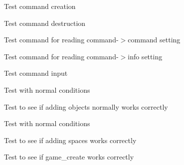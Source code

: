 
\begin{DoxyRefList}
\item[\label{test__test000001}%
\hypertarget{test__test000001}{}%
Member \hyperlink{command__test_8h_abed44af325fd42a3f4f4aa134315435c}{test1\+\_\+command\+\_\+create} ()]Test command creation  
\item[\label{test__test000002}%
\hypertarget{test__test000002}{}%
Member \hyperlink{command__test_8h_aadf731a98e5122e70ede7cdc68ba621f}{test1\+\_\+command\+\_\+destroy} ()]Test command destruction  
\item[\label{test__test000007}%
\hypertarget{test__test000007}{}%
Member \hyperlink{command__test_8h_aa5f2c4937af80de245778a8ac348cf3b}{test1\+\_\+command\+\_\+get\+\_\+command} ()]Test command for reading command-\/$>$command setting  
\item[\label{test__test000009}%
\hypertarget{test__test000009}{}%
Member \hyperlink{command__test_8h_a6aa58960e0653f7a4fb5c30350d64e54}{test1\+\_\+command\+\_\+get\+\_\+info} ()]Test command for reading command-\/$>$info setting  
\item[\label{test__test000004}%
\hypertarget{test__test000004}{}%
Member \hyperlink{command__test_8h_a932afa8fb63c9b8ba551d030886ce491}{test1\+\_\+command\+\_\+get\+\_\+user\+\_\+input} ()]Test command input  
\item[\label{test__test000085}%
\hypertarget{test__test000085}{}%
Member \hyperlink{game__test_8h_ab936ab03dff02b8edde97651f12384ea}{test1\+\_\+game\+\_\+add\+\_\+link} ()]Test with normal conditions  
\item[\label{test__test000047}%
\hypertarget{test__test000047}{}%
Member \hyperlink{game__test_8h_ac60415277fc72d0a231b17e482a6609b}{test1\+\_\+game\+\_\+add\+\_\+object} ()]Test to see if adding objects normally works correctly  
\item[\label{test__test000042}%
\hypertarget{test__test000042}{}%
Member \hyperlink{game__test_8h_a4adb115e4624c38738c938b999f6c949}{test1\+\_\+game\+\_\+add\+\_\+player} ()]Test with normal conditions  
\item[\label{test__test000038}%
\hypertarget{test__test000038}{}%
Member \hyperlink{game__test_8h_a49b59f8e75a8a4375c98ded865f16fcc}{test1\+\_\+game\+\_\+add\+\_\+space} ()]Test to see if adding spaces works correctly  
\item[\label{test__test000027}%
\hypertarget{test__test000027}{}%
Member \hyperlink{game__test_8h_a1d5c70cf073b025bb5d74413cecd929b}{test1\+\_\+game\+\_\+create} ()]Test to see if game\+\_\+create works correctly  

\end{DoxyRefList}
